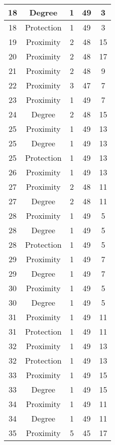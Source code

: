 \documentclass[results.tex]{subfiles}
\begin{document}
\begin{center}
\begin{tabular}{| c || c | c | c | c |}
    \hline
    18 & Degree & 1 & 49 & 3 \\ 
    \hline
    18 & Protection & 1 & 49 & 3 \\ 
    \hline
    19 & Proximity & 2 & 48 & 15 \\ 
    \hline
    20 & Proximity & 2 & 48 & 17 \\ 
    \hline
    21 & Proximity & 2 & 48 & 9 \\ 
    \hline
    22 & Proximity & 3 & 47 & 7 \\ 
    \hline
    23 & Proximity & 1 & 49 & 7 \\ 
    \hline
    24 & Degree & 2 & 48 & 15 \\ 
    \hline
    25 & Proximity & 1 & 49 & 13 \\ 
    \hline
    25 & Degree & 1 & 49 & 13 \\ 
    \hline
    25 & Protection & 1 & 49 & 13 \\ 
    \hline
    26 & Proximity & 1 & 49 & 13 \\ 
    \hline
    27 & Proximity & 2 & 48 & 11 \\ 
    \hline
    27 & Degree & 2 & 48 & 11 \\ 
    \hline
    28 & Proximity & 1 & 49 & 5 \\ 
    \hline
    28 & Degree & 1 & 49 & 5 \\ 
    \hline
    28 & Protection & 1 & 49 & 5 \\ 
    \hline
    29 & Proximity & 1 & 49 & 7 \\ 
    \hline
    29 & Degree & 1 & 49 & 7 \\ 
    \hline
    30 & Proximity & 1 & 49 & 5 \\ 
    \hline
    30 & Degree & 1 & 49 & 5 \\ 
    \hline
    31 & Proximity & 1 & 49 & 11 \\ 
    \hline
    31 & Protection & 1 & 49 & 11 \\ 
    \hline
    32 & Proximity & 1 & 49 & 13 \\ 
    \hline
    32 & Protection & 1 & 49 & 13 \\ 
    \hline
    33 & Proximity & 1 & 49 & 15 \\ 
    \hline
    33 & Degree & 1 & 49 & 15 \\ 
    \hline
    34 & Proximity & 1 & 49 & 11 \\ 
    \hline
    34 & Degree & 1 & 49 & 11 \\ 
    \hline
    35 & Proximity & 5 & 45 & 17 \\ 

\end{tabular}
\end{center}
\end{document}
